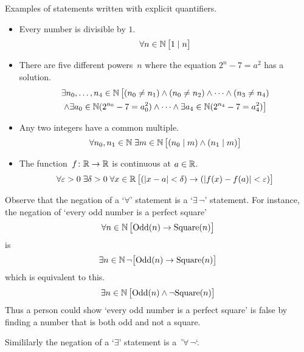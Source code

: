 \documentclass[10pt,t]{beamer}
\begin{document}
\begin{frame}
Examples of statements written with explicit quantifiers.

\begin{itemize}
\item Every number is divisible by $1$.
  \begin{equation*}
    \forall n\in\mathbb{N}\,\big[1\mid n\big]
  \end{equation*}

\pause
\item There are five different powers~$n$ where the equation $2^n-7=a^2$ has a solution.
  \begin{multline*}
    \exists n_0, \ldots, n_4\in\mathbb{N}\, \big[(n_0\neq n_1) 
                                     \wedge (n_0\neq n_2) 
                                     \wedge \cdots 
                                     \wedge (n_3\neq n_4)  \\
                                     \wedge \exists a_0\in\mathbb{N}(2^{n_0}-7=a_0^2)
                                     \wedge\cdots\wedge
                                     \exists a_4\in\mathbb{N}(2^{n_4}-7=a_4^2)\big]
  \end{multline*}

\pause
\item Any two integers have a common multiple.
  \begin{equation*}
    \forall n_0,n_1\in\mathbb{N}\;\exists m\in\mathbb{N}\,
        \big[(n_0\mid m)\wedge (n_1\mid m)\big]
  \end{equation*}

\pause
\item The function~$\mbox{$f\colon \mathbb{R}\to \mathbb{R}$}$ is continuous at $a\in\mathbb{R}$.
  \begin{equation*}
    \forall \varepsilon >0\;\exists \delta > 0\;\forall x\in\mathbb{R}\,
        \big[(\lvert x-a\rvert<\delta)\rightarrow (\lvert f(x)-f(a)\rvert<\varepsilon)\big]
  \end{equation*}
\end{itemize}
\end{frame}
\begin{frame}
Observe that the negation of a `$\forall$' statement is a `$\exists\,\neg$' 
statement.
For instance, the negation of `every odd number is a perfect square'
\begin{equation*}
  \forall n\in\mathbb{N}\,\big[ \text{Odd}(n)\rightarrow\text{Square}(n)\big]
\end{equation*}
is 
\begin{equation*}
  \exists n\in\mathbb{N}\,\neg\big[ \text{Odd}(n)\rightarrow\text{Square}(n)\big]
\end{equation*}
which is equivalent to this.
\begin{equation*}
  \exists n\in\mathbb{N}\,\big[\text{Odd}(n)\wedge\neg\text{Square}(n)\big]
\end{equation*}
Thus a person could show `every odd number is a perfect square' is false
by finding a number that is both odd and not a square.

\pause
Simililarly the negation of a `$\exists$' statement is a~'$\forall\,\neg$`. 
\end{frame}
\end{document}
